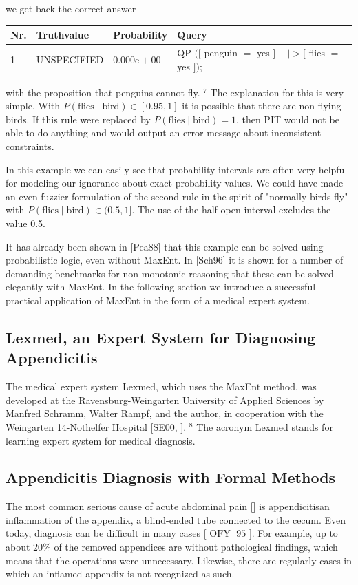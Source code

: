 \documentclass[10pt]{book}
\begin{document}
we get back the correct answer

\begin{center}
\begin{tabular}{llll}
\hline
Nr. & Truthvalue & Probability & Query \\
\hline
1 & UNSPECIFIED & $0.000 \mathrm{e}+00$ & QP $([$ penguin $=$ yes $]-\mid>[$ flies $=$ yes $]) ;$ \\
\hline
\end{tabular}
\end{center}

with the proposition that penguins cannot fly. ${ }^{7}$ The explanation for this is very simple. With $P(\text{flies} \mid \text{bird}) \in [0.95,1]$ it is possible that there are non-flying birds. If this rule were replaced by $P(\text{flies} \mid \text{bird}) = 1$, then PIT would not be able to do anything and would output an error message about inconsistent constraints.

In this example we can easily see that probability intervals are often very helpful for modeling our ignorance about exact probability values. We could have made an even fuzzier formulation of the second rule in the spirit of "normally birds fly" with $P(\text{flies} \mid \text{bird}) \in (0.5,1]$. The use of the half-open interval excludes the value 0.5.

It has already been shown in [Pea88] that this example can be solved using probabilistic logic, even without MaxEnt. In [Sch96] it is shown for a number of demanding benchmarks for non-monotonic reasoning that these can be solved elegantly with MaxEnt. In the following section we introduce a successful practical application of MaxEnt in the form of a medical expert system.

\subsection{Lexmed, an Expert System for Diagnosing Appendicitis}
The medical expert system Lexmed, which uses the MaxEnt method, was developed at the Ravensburg-Weingarten University of Applied Sciences by Manfred Schramm, Walter Rampf, and the author, in cooperation with the Weingarten 14-Nothelfer Hospital [SE00, \cite{lexmed1999}]. ${ }^{8}$ The acronym Lexmed stands for learning expert system for medical diagnosis.

\subsection{Appendicitis Diagnosis with Formal Methods}
The most common serious cause of acute abdominal pain [\cite{dedombal1991diagnosis}] is appendicitisan inflammation of the appendix, a blind-ended tube connected to the cecum. Even today, diagnosis can be difficult in many cases [ $\mathrm{OFY}^{+} 95$ ]. For example, up to about $20 \%$ of the removed appendices are without pathological findings, which means that the operations were unnecessary. Likewise, there are regularly cases in which an inflamed appendix is not recognized as such.
\end{document}
